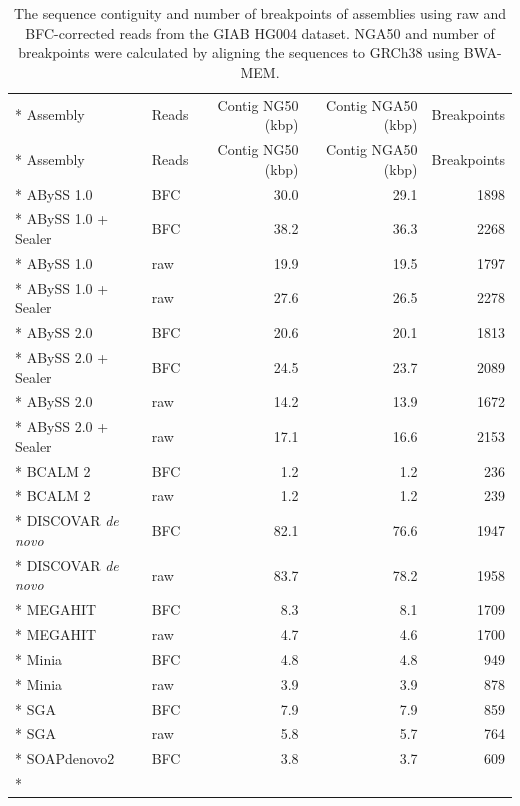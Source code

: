 \documentclass[
  12pt,
  oneside,
  openany]{book}
\begin{document}
\begin{appendices}
\hypertarget{tbl:rawstats}{}
\begin{singlespace}
\small
\begin{longtable}[]{@{}llrrr@{}}
\caption[The sequence contiguity and number of breakpoints of assemblies using raw and BFC-corrected reads from the GIAB HG004 dataset.]{\label{tbl:rawstats}The sequence contiguity and number of breakpoints of assemblies using raw and BFC-corrected reads from the GIAB HG004 dataset. NGA50 and number of breakpoints were calculated by aligning the sequences to GRCh38 using BWA-MEM.}\tabularnewline*
\toprule
Assembly & Reads & Contig NG50 (kbp) & Contig NGA50 (kbp) & Breakpoints\tabularnewline*
\midrule
\endfirsthead
\toprule
Assembly & Reads & Contig NG50 (kbp) & Contig NGA50 (kbp) & Breakpoints\tabularnewline*
\midrule
\endhead
ABySS 1.0 & BFC & 30.0 & 29.1 & 1898\tabularnewline*
ABySS 1.0 + Sealer & BFC & 38.2 & 36.3 & 2268\tabularnewline*
ABySS 1.0 & raw & 19.9 & 19.5 & 1797\tabularnewline*
ABySS 1.0 + Sealer & raw & 27.6 & 26.5 & 2278\tabularnewline*
ABySS 2.0 & BFC & 20.6 & 20.1 & 1813\tabularnewline*
ABySS 2.0 + Sealer & BFC & 24.5 & 23.7 & 2089\tabularnewline*
ABySS 2.0 & raw & 14.2 & 13.9 & 1672\tabularnewline*
ABySS 2.0 + Sealer & raw & 17.1 & 16.6 & 2153\tabularnewline*
BCALM 2 & BFC & 1.2 & 1.2 & 236\tabularnewline*
BCALM 2 & raw & 1.2 & 1.2 & 239\tabularnewline*
DISCOVAR \emph{de novo} & BFC & 82.1 & 76.6 & 1947\tabularnewline*
DISCOVAR \emph{de novo} & raw & 83.7 & 78.2 & 1958\tabularnewline*
MEGAHIT & BFC & 8.3 & 8.1 & 1709\tabularnewline*
MEGAHIT & raw & 4.7 & 4.6 & 1700\tabularnewline*
Minia & BFC & 4.8 & 4.8 & 949\tabularnewline*
Minia & raw & 3.9 & 3.9 & 878\tabularnewline*
SGA & BFC & 7.9 & 7.9 & 859\tabularnewline*
SGA & raw & 5.8 & 5.7 & 764\tabularnewline*
SOAPdenovo2 & BFC & 3.8 & 3.7 & 609\tabularnewline*
\bottomrule
\end{longtable}
\end{singlespace}


\end{appendices}
\end{document}
